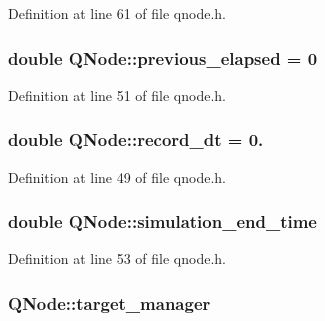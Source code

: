 Definition at line 61 of file qnode.\+h.

\subsubsection[{\texorpdfstring{previous\+\_\+elapsed}{previous_elapsed}}]{\setlength{\rightskip}{0pt plus 5cm}double Q\+Node\+::previous\+\_\+elapsed = 0}\hypertarget{class_q_node_a4b5f0a40821fbb176de620cb5a3921f7}{}\label{class_q_node_a4b5f0a40821fbb176de620cb5a3921f7}


Definition at line 51 of file qnode.\+h.

\subsubsection[{\texorpdfstring{record\+\_\+dt}{record_dt}}]{\setlength{\rightskip}{0pt plus 5cm}double Q\+Node\+::record\+\_\+dt = 0.}\hypertarget{class_q_node_ad1f3252201b932fc5d39b4f80349c7e2}{}\label{class_q_node_ad1f3252201b932fc5d39b4f80349c7e2}


Definition at line 49 of file qnode.\+h.

\subsubsection[{\texorpdfstring{simulation\+\_\+end\+\_\+time}{simulation_end_time}}]{\setlength{\rightskip}{0pt plus 5cm}double Q\+Node\+::simulation\+\_\+end\+\_\+time}\hypertarget{class_q_node_a7a127726e48aa5bde733d715af7a744c}{}\label{class_q_node_a7a127726e48aa5bde733d715af7a744c}


Definition at line 53 of file qnode.\+h.

\subsubsection[{\texorpdfstring{target\+\_\+manager}{target_manager}}]{ Q\+Node\+::target\+\_\+manager}\hypertarget{class_q_node_adc66765125dfd755d5e7f0c0eb6e6395}{}\label{class_q_node_adc66765125dfd755d5e7f0c0eb6e6395}


